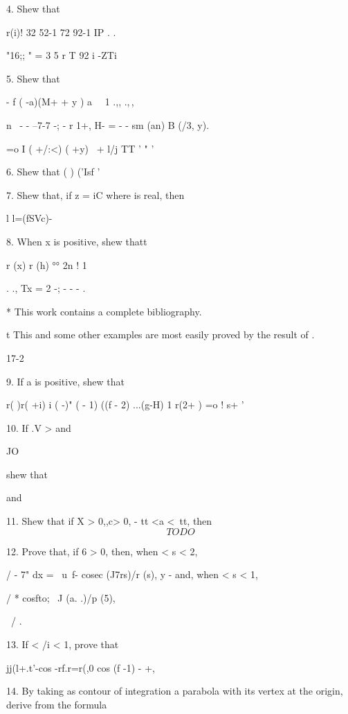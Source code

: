 4. Shew that

 r(i)! 32 52-1 72 92-1 IP . .

"16;; " = 3  5  r T  92  i -ZTi  

5. Shew that

- f ( -a)(M+ + y ) a \ \ 1 .,, .,\,,

n \ - - --7-7 -; - r 1+, H- = - - sm (an) B (/3, y).

 =o I ( +/:<) ( +y) \ + l/j TT ' " '


6. Shew that ( ) ('Isf ' 

7. Shew that, if z = iC where is real, then

l l=\/(fSVc)- 

8. When x is positive, shew thatt

r (x) r (h) °° 2n ! 1

 . ., Tx = 2 -; - - - . 

* This work contains a complete bibliography.

t This and some other examples are most easily proved by the result of .

17-2

%
%

9. If a is positive, shew that

r( )r( +i) i ( -)" ( - 1) ((f - 2) ...(g-H) 1 r(2+ ) =o ! s+ '

10. If .V > and

JO

shew that

and

11. Shew that if X > 0,,c> 0, - tt <a <\ tt, then
$$
TODO
$$

12. Prove that, if 6 > 0, then, when < s < 2,

/ - 7" dx = \ u\ f- cosec (J7rs)/r (s), y - and, when < s < 1,

/ * cosfto; \ J (a. .)/p (5), 

\ / .

13. If < /i < 1, prove that

jj(l+.t'-cos -rf.r=r(,0 cos (f -1) - +,


14. By taking as contour of integration a parabola with its vertex at
the origin, derive from the formula

